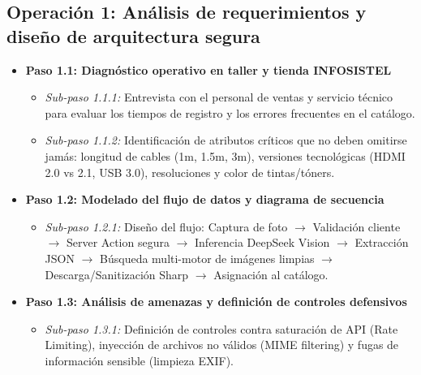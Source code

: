 \documentclass[11pt,a4paper]{article}
\begin{document}
\subsection{Operación 1: Análisis de requerimientos y diseño de arquitectura segura}
\begin{itemize}
    \item \textbf{Paso 1.1: Diagnóstico operativo en taller y tienda INFOSISTEL}
    \begin{itemize}
        \item \textit{Sub-paso 1.1.1:} Entrevista con el personal de ventas y servicio técnico para evaluar los tiempos de registro y los errores frecuentes en el catálogo.
        \item \textit{Sub-paso 1.1.2:} Identificación de atributos críticos que no deben omitirse jamás: longitud de cables (1m, 1.5m, 3m), versiones tecnológicas (HDMI 2.0 vs 2.1, USB 3.0), resoluciones y color de tintas/tóners.
    \end{itemize}
    \item \textbf{Paso 1.2: Modelado del flujo de datos y diagrama de secuencia}
    \begin{itemize}
        \item \textit{Sub-paso 1.2.1:} Diseño del flujo: Captura de foto $\rightarrow$ Validación cliente $\rightarrow$ Server Action segura $\rightarrow$ Inferencia DeepSeek Vision $\rightarrow$ Extracción JSON $\rightarrow$ Búsqueda multi-motor de imágenes limpias $\rightarrow$ Descarga/Sanitización Sharp $\rightarrow$ Asignación al catálogo.
    \end{itemize}
    \item \textbf{Paso 1.3: Análisis de amenazas y definición de controles defensivos}
    \begin{itemize}
        \item \textit{Sub-paso 1.3.1:} Definición de controles contra saturación de API (Rate Limiting), inyección de archivos no válidos (MIME filtering) y fugas de información sensible (limpieza EXIF).
    \end{itemize}
\end{itemize}
\end{document}
